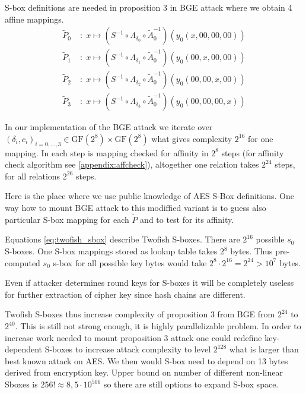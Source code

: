 \documentclass[11pt,oneside,final]{fithesis2}
\begin{document}
    S-box definitions are needed in proposition 3 in BGE attack where we obtain 4 affine mappings.
    \begin{subequations}\label{eq:BGE_prop3}
    \begin{align}
	\widetilde{P}_0 \;&: \; x \mapsto \left( S^{-1} \circ \Lambda_{\delta_0} \circ \widetilde{A}_0^{-1}\right) \left( y_0\left(x, 00, 00, 00\right) \right)\\
	\widetilde{P}_1 \;&: \; x \mapsto \left( S^{-1} \circ \Lambda_{\delta_1} \circ \widetilde{A}_0^{-1}\right) \left( y_0\left(00, x, 00, 00\right) \right)\\
	\widetilde{P}_2 \;&: \; x \mapsto \left( S^{-1} \circ \Lambda_{\delta_2} \circ \widetilde{A}_0^{-1}\right) \left( y_0\left(00, 00, x, 00\right) \right)\\
	\widetilde{P}_3 \;&: \; x \mapsto \left( S^{-1} \circ \Lambda_{\delta_3} \circ \widetilde{A}_0^{-1}\right) \left( y_0\left(00, 00, 00, x\right) \right)
    \end{align}
    \end{subequations}
    
    In our implementation of the BGE attack we iterate over $\left(\delta_i, c_i\right)_{i=0,\dots,3} \in \text{GF}(2^8)\times\text{GF}(2^8)$ what gives complexity $2^{16}$ for one mapping.
    In each step is mapping checked for affinity in $2^8$ steps (for affinity check algorithm see \ref{appendix:affcheck}), altogether one relation takes $2^{24}$ steps, for all relations
    $2^{26}$ steps.
    
    Here is the place where we use public knowledge of AES S-Box definitions. One way how to mount BGE attack to this modiffied variant is to guess also particular S-box
    mapping for each $\widetilde{P}$ and to test for its affinity. 
    
    Equations \ref{eq:twofish_sbox} describe Twofish S-boxes. There are $2^{16}$ possible $s_0$ S-boxes. One S-box mappings stored as lookup table takes $2^8$ bytes.
    Thus pre-computed $s_0$ s-box for all possible key bytes would take $2^8 \cdot 2^{16} = 2^{24} > 10^7$ bytes. 
    
    Even if attacker determines round keys for S-boxes it will be completely useless for further extraction of cipher key since hash chains are different. 
    
    Twofish S-boxes thus increase complexity of proposition 3 from BGE from $2^{24}$ to $2^{40}$. This is still not strong enough, it is highly parallelizable problem.
    In order to increase work needed to mount proposition 3 attack one could redefine key-dependent S-boxes to increase attack complexity to level $2^{128}$ what is larger
    than best known attack on AES. We then would S-box need to depend on 13 bytes derived from encryption key. Upper bound on number of different non-linear Sboxes is $256! \approx 8,5\cdot 10^{506}$ so there are still options to expand 
    S-box space. 
    
\end{document}
